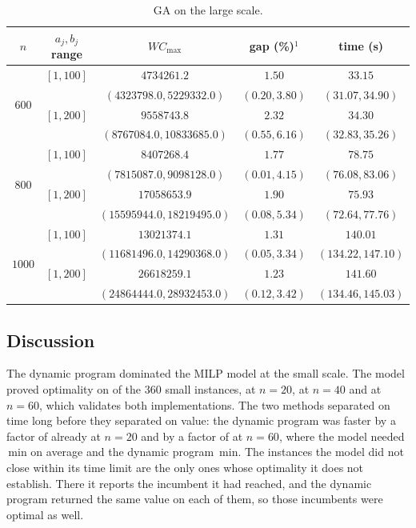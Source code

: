 \documentclass[12pt]{article}
\newlength{\resultstabwidth}
\newcommand{\resultstable}{%
    \centering
    \footnotesize
    \setlength{\tabcolsep}{4pt}%
    \renewcommand{\arraystretch}{1.15}}
\let\origsubsection\subsection
\renewcommand{\subsection}{\FloatBarrier\origsubsection}
\begin{document}
\begin{sloppypar}
\begin{table}[H]
\resultstable
\caption{GA on the large scale.}
\label{tab:results-large-ga}
\begin{tabular*}{\resultstabwidth}{@{\extracolsep{\fill}}ccccc@{}}
\toprule
$n$ & $a_j,b_j$ range & $W C_{\max}$ & gap (\%)$^{1}$ & time (s) \\
\midrule
\multirow{4}{*}{$600$} & $[1,100]$ & $4734261.2$ & $1.50$ & $33.15$ \\
                        &           & $(4323798.0, 5229332.0)$ & $(0.20, 3.80)$ & $(31.07, 34.90)$ \\
                        & $[1,200]$ & $9558743.8$ & $2.32$ & $34.30$ \\
                        &           & $(8767084.0, 10833685.0)$ & $(0.55, 6.16)$ & $(32.83, 35.26)$ \\
\midrule
\multirow{4}{*}{$800$} & $[1,100]$ & $8407268.4$ & $1.77$ & $78.75$ \\
                        &           & $(7815087.0, 9098128.0)$ & $(0.01, 4.15)$ & $(76.08, 83.06)$ \\
                        & $[1,200]$ & $17058653.9$ & $1.90$ & $75.93$ \\
                        &           & $(15595944.0, 18219495.0)$ & $(0.08, 5.34)$ & $(72.64, 77.76)$ \\
\midrule
\multirow{4}{*}{$1000$} & $[1,100]$ & $13021374.1$ & $1.31$ & $140.01$ \\
                        &           & $(11681496.0, 14290368.0)$ & $(0.05, 3.34)$ & $(134.22, 147.10)$ \\
                        & $[1,200]$ & $26618259.1$ & $1.23$ & $141.60$ \\
                        &           & $(24864444.0, 28932453.0)$ & $(0.12, 3.42)$ & $(134.46, 145.03)$ \\
\bottomrule
\end{tabular*}
\end{table}


\subsection{Discussion}

The dynamic program dominated the MILP model at the small scale. The model proved optimality
on \TBD of the $360$ small instances, \TBD at $n=20$, \TBD at $n=40$ and \TBD at $n=60$,
which validates both implementations. The two methods separated on time
long before they separated on value: the dynamic program was faster by a factor of \TBD
already at $n=20$ and by a factor of \TBD at $n=60$, where the model needed \TBD\,min on
average and the dynamic program \TBD\,min. The \TBD instances the model did not close
within its time limit are the only ones whose optimality it does not establish. There it
reports the incumbent it had reached, and the dynamic program returned the same value on
each of them, so those incumbents were optimal as well.


\end{sloppypar}
\end{document}
